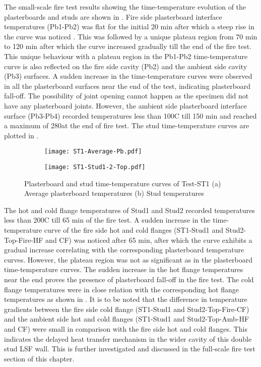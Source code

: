 The small-scale fire test results showing the time-temperature evolution of the plasterboards and studs are shown in . Fire side plasterboard interface temperatures (Pb1-Pb2) was flat for the initial 20 min after which a steep rise in the curve was noticed . This was followed by a unique plateau region from 70 min to 120 min after which the curve increased gradually till the end of the fire test. This unique behaviour with a plateau region in the Pb1-Pb2 time-temperature curve is also reflected on the fire side cavity (Pb2) and the ambient side cavity (Pb3) surfaces. A sudden increase in the time-temperature curves were observed in all the plasterboard surfaces near the end of the test, indicating plasterboard fall-off. The possibility of joint opening cannot happen as the specimen did not have any plasterboard joints. However, the ambient side plasterboard interface surface (Pb3-Pb4) recorded temperatures less than 100\degree C till 150 min and reached a maximum of 280\degree at the end of fire test. The stud time-temperature curves are plotted in .  
\begin{figure}[!htbp]
	\centering
	\begin{subfigure}[b]{0.7\textwidth}
		\centering
		\texttt{[image: ST1-Average-Pb.pdf]}
		\caption{}
		\label{subfig:ST1-Average-Pb}
	\end{subfigure}
	\begin{subfigure}[b]{0.7\textwidth}
		\centering
		\texttt{[image: ST1-Stud1-2-Top.pdf]}
		\caption{}
		\label{subfig:ST1-Stud1-2-Top}
	\end{subfigure}
	   \caption{Plasterboard and stud time-temperature curves of Test-ST1 (a) Average plasterboard temperatures (b) Stud temperatures}
	   \label{fig:ST1-PB-Stud}
\end{figure}

The hot and cold flange temperatures of Stud1 and Stud2 recorded temperatures less than 200\degree C till 65 min of the fire test. A sudden increase in the time-temperature curve of the fire side hot and cold flanges (ST1-Stud1 and Stud2-Top-Fire-HF and CF) was noticed after 65 min, after which the curve exhibits a gradual increase correlating with the corresponding plasterboard temperature curves. However, the plateau region was not as significant as in the plasterboard time-temperature curves. The sudden increase in the hot flange temperatures near the end proves the presence of plasterboard fall-off in the fire test. The cold flange temperatures were in close relation with the corresponding hot flange temperatures as shown in . It is to be noted that the difference in temperature gradients between the fire side cold flange (ST1-Stud1 and Stud2-Top-Fire-CF) and the ambient side hot and cold flanges (ST1-Stud1 and Stud2-Top-Amb-HF and CF) were small in comparison with the fire side hot and cold flanges. This indicates the delayed heat transfer mechanism in the wider cavity of this double stud LSF wall. This is further investigated and discussed in the full-scale fire test section of this chapter.

